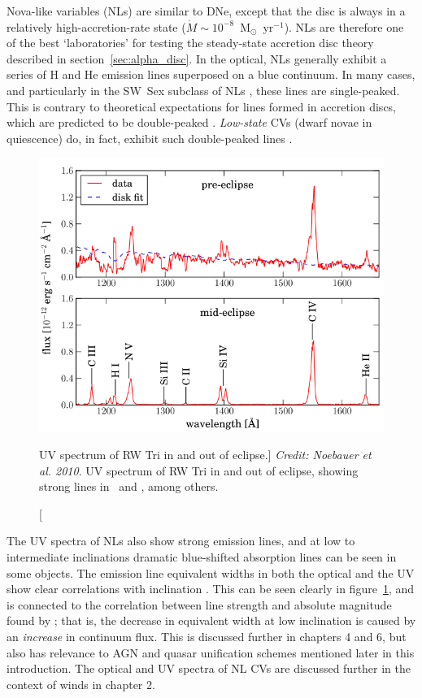 Nova-like variables (NLs) are similar to DNe,
except that the disc is always in a relatively 
high-accretion-rate state ($\dot{M} \sim 10^{-8}$~M$_{\odot}$~yr$^{-1}$).
NLs are therefore one of the best `laboratories' for testing the steady-state
accretion disc theory described in section~\ref{sec:alpha_disc}.
In the optical, NLs generally exhibit a series of H and He emission 
lines superposed on a blue continuum. In many
cases, and particularly in the SW~Sex subclass of NLs
\citep{HSK86,DR95}, these lines are single-peaked. This is contrary to
theoretical expectations for lines formed in accretion discs, which
are predicted to be double-peaked \citep{smak1981, hornemarsh1986}. 
{\em Low-state} CVs (dwarf novae in quiescence) do, in fact,
exhibit such double-peaked lines \citep{marshhorne1990}. 

\nocite{dhillon1996,hessman1984}
\begin{figure}
\centering
\includegraphics[width=1.0\textwidth]{figures/02-outflows/rwtri_noe.png}
\caption
[UV spectrum of RW Tri in and out of eclipse.]
{
{\sl Credit: Noebauer et al. 2010}.
UV spectrum of RW Tri in and out of eclipse, showing strong lines in 
\civfull\ and \la, among others.
} 
\label{fig:NL_spec}
\end{figure}


The UV spectra of NLs also show strong emission lines, and at 
low to intermediate inclinations dramatic blue-shifted absorption lines
can be seen in some objects. The emission line equivalent widths
in both the optical and the UV show clear correlations with 
inclination \citep{hessman1984,echevarria1988,noebauer}. 
This can be seen clearly in figure~\ref{fig:NL_spec}, and is connected to
the correlation between line strength and absolute magnitude found by \cite{patterson1984};
that is, the decrease in equivalent width at low inclination is caused by an {\em increase}
in continuum flux. This is discussed further in chapters 4 and 6, but also has 
relevance to AGN and quasar unification schemes mentioned later in this introduction.
The optical and UV spectra of NL CVs are discussed further
in the context of winds in chapter 2.

